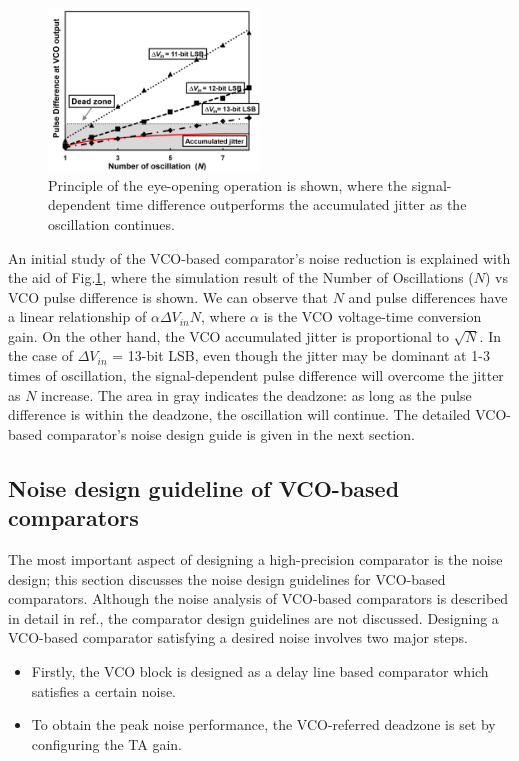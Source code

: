 \documentclass[journal]{IEEEtran}
\begin{document}
\begin{figure}[!]
\centering
 \includegraphics[width=0.5\textwidth]{figs/fig5.png}
  \caption{Principle of the eye-opening operation is shown, where the signal-dependent time difference outperforms the accumulated jitter as the oscillation continues.}
  \label{fig5}
\end{figure}

An initial study of the VCO-based comparator's noise reduction is explained with the aid of Fig.\ref{fig5}, where the simulation result of the Number of Oscillations ($N$) vs VCO pulse difference is shown. %
We can observe that $N$ and pulse differences have a linear relationship of $\alpha \Delta V_{in}N$, where $\alpha$ is the VCO voltage-time conversion gain. On the other hand, the VCO accumulated jitter is proportional to $\sqrt N$\cite{hajimiri1999jitter,abidi2006phase}. In the case of $\Delta V_{in}$ = 13-bit LSB, even though the jitter may be dominant at 1-3 times of oscillation, the signal-dependent pulse difference will overcome the jitter as $N$ increase. The area in gray indicates the deadzone: as long as the pulse difference is within the deadzone, the oscillation will continue. The detailed VCO-based comparator's noise design guide is given in the next section.

\subsection{Noise design guideline of VCO-based comparators}
The most important aspect of designing a high-precision comparator is the noise design; this section discusses the noise design guidelines for VCO-based comparators. Although the noise analysis of VCO-based comparators is described in detail in ref.\cite{luo2020input, ding20190}, the comparator design guidelines are not discussed. %
Designing a VCO-based comparator satisfying a desired noise involves two major steps.
\begin{itemize}
\item Firstly, the VCO block is designed as a delay line based comparator which satisfies a certain noise. %
\item To obtain the peak noise performance, the VCO-referred deadzone is set by configuring the TA gain.
\end{itemize}
\end{document}
